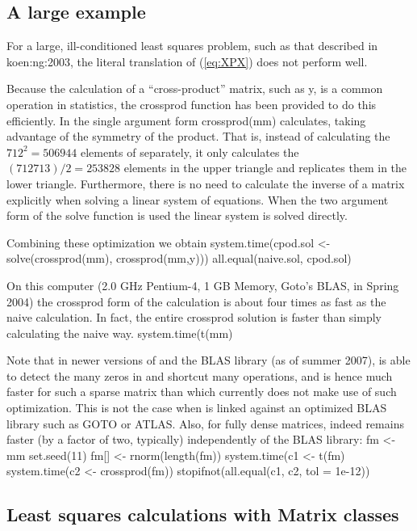 \documentclass{article}
\begin{document}
\subsection{A large example}
\label{sec:largeLSQ}

For a large, ill-conditioned least squares problem, such as that
described in koen:ng:2003, the literal translation of
(\ref{eq:XPX}) does not perform well.

Because the calculation of a ``cross-product'' matrix, such as
y, is a common operation in
statistics, the crossprod function has been provided to do
this efficiently.  In the single argument form crossprod(mm)
calculates, taking advantage of the symmetry of the
product.  That is, instead of calculating the $712^2=506944$ elements of
separately, it only calculates the $(712
713)/2=253828$ elements in the upper triangle and replicates them in
the lower triangle. Furthermore, there is no need to calculate the
inverse of a matrix explicitly when solving a
linear system of equations.  When the two argument form of the solve
function is used the linear system
is solved directly.

Combining these optimization we obtain
system.time(cpod.sol <- solve(crossprod(mm), crossprod(mm,y)))
all.equal(naive.sol, cpod.sol)


On this computer (2.0 GHz Pentium-4, 1 GB Memory, Goto's BLAS, in Spring
2004) the
crossprod form of the calculation is about four times as fast as the
naive calculation.  In fact, the entire crossprod solution is
faster than simply calculating the naive way.
system.time(t(mm) %

Note that in newer versions of and the BLAS library (as of summer
2007), is able to detect the many zeros in and
shortcut many operations, and is hence much faster for such a sparse matrix
than which currently does not make use of such
optimization.  This is not the case when is linked against an
optimized BLAS library such as GOTO or ATLAS.
Also, for fully dense matrices, indeed remains faster
(by a factor of two, typically) independently of the BLAS library:
fm <- mm
set.seed(11)
fm[] <- rnorm(length(fm))
system.time(c1 <- t(fm) %
system.time(c2 <- crossprod(fm))
stopifnot(all.equal(c1, c2, tol = 1e-12))


\subsection{Least squares calculations with Matrix classes}
\label{sec:MatrixLSQ}
\end{document}
